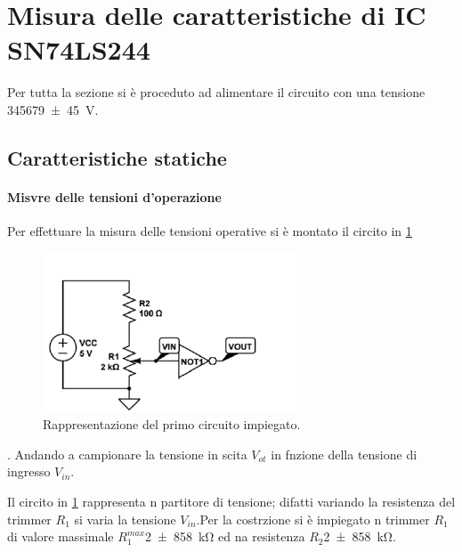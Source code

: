 \section{Misura delle caratteristiche di IC SN74LS244 }
Per tutta la sezione si è proceduto ad alimentare il circuito con una tensione 
\SI{345679 \pm 45}{\volt}.

\subsection{Caratteristiche statiche}
	\paragraph{Misvre delle tensioni d'operazione}
	Per effettuare la misura delle tensioni operative si 
	è montato il circito in \figurename{ \ref{f:c1}}
		\begin{figure}[h]
			\includegraphics[scale=1.0]{immagine1.png}
			\caption{Rappresentazione del primo circuito impiegato.}
			\label{f:c1}
		\end{figure} .
	Andando a campionare la tensione in scita $V_{ot}$ in fnzione della tensione di ingresso  $V_{in}$.
	
	Il circito in  \figurename{ \ref{f:c1}} rappresenta n partitore di tensione;
		difatti variando la resistenza del trimmer $R_{1}$ si varia la tensione $V_{in}$.Per la costrzione si è impiegato n trimmer $R_{1}$ di valore massimale $R_{1}^{max}$\SI{2 \pm 858}{\kilo \ohm} ed na resistenza $R_{2}$\SI{2 \pm 858}{\kilo \ohm}.
		
